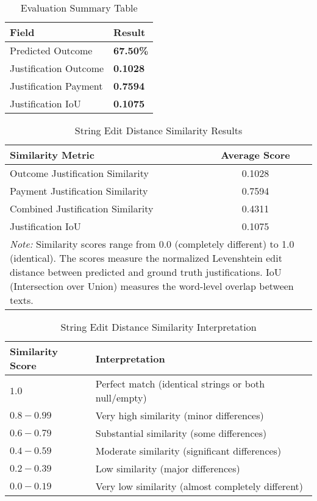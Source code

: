 
\begin{table}[H]
\centering
\caption{Evaluation Summary Table}
\label{tab:evaluation_summary}
\begin{tabular}{@{}lp{2cm}@{}}
\toprule
\textbf{Field} & \textbf{Result} \\
\midrule
Predicted Outcome & \textbf{67.50\%} \\
Justification Outcome &  \textbf{0.1028} \\
Justification Payment &  \textbf{0.7594} \\
Justification IoU &  \textbf{0.1075} \\
\bottomrule
\end{tabular}
\end{table}

\begin{table}[!ht]
\centering
\caption{String Edit Distance Similarity Results}
\label{tab:string_edit_distance_results}
\begin{tabular}{lc}
\toprule
\textbf{Similarity Metric} & \textbf{Average Score} \\
\midrule
Outcome Justification Similarity & 0.1028 \\
Payment Justification Similarity & 0.7594 \\
Combined Justification Similarity & 0.4311 \\
Justification IoU & 0.1075 \\
\midrule
\multicolumn{2}{p{13cm}}{\textit{Note:} Similarity scores range from 0.0 (completely different) to 1.0 (identical). 
The scores measure the normalized Levenshtein edit distance between predicted and ground truth justifications.
IoU (Intersection over Union) measures the word-level overlap between texts.} \\
\bottomrule
\end{tabular}
\end{table}

\begin{table}[!ht]
\centering
\caption{String Edit Distance Similarity Interpretation}
\label{tab:string_edit_distance_interpretation}
\begin{tabular}{p{3cm}p{10cm}}
\toprule
\textbf{Similarity Score} & \textbf{Interpretation} \\
\midrule
$1.0$ & Perfect match (identical strings or both null/empty) \\
$0.8 - 0.99$ & Very high similarity (minor differences) \\
$0.6 - 0.79$ & Substantial similarity (some differences) \\
$0.4 - 0.59$ & Moderate similarity (significant differences) \\
$0.2 - 0.39$ & Low similarity (major differences) \\
$0.0 - 0.19$ & Very low similarity (almost completely different) \\
\bottomrule
\end{tabular}
\end{table}

